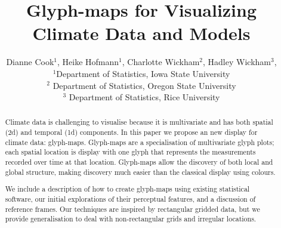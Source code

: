 \documentclass[oneside]{article}
\begin{document}
\title{Glyph-maps for Visualizing Climate Data and Models}
\author{Dianne Cook$^1$, Heike Hofmann$^1$, Charlotte Wickham$^2$, Hadley Wickham$^3$, \\
$^1$Department of Statistics, Iowa State University\\
$^2$ Department of Statistics, Oregon State University\\
$^3$ Department of Statistics, Rice University}
\date{}



%
%
\maketitle

\begin{abstract}

Climate data is challenging to visualise because it is multivariate and has both spatial (2d) and temporal (1d) components. In this paper we propose an new display for climate data: glyph-maps. Glyph-maps are a specialisation of multivariate glyph plots; each spatial location is display with one glyph that represents the measurements recorded over time at that location. Glyph-maps allow the discovery of both local and global structure, making discovery much easier than the classical display using colours.

We include a description of how to create glyph-maps using existing statistical software, our initial explorations of their perceptual features, and a discussion of reference frames. Our techniques are inspired by rectangular gridded data, but we provide generalisation to deal with non-rectangular grids and irregular locations.

\end{abstract}
\end{document}
